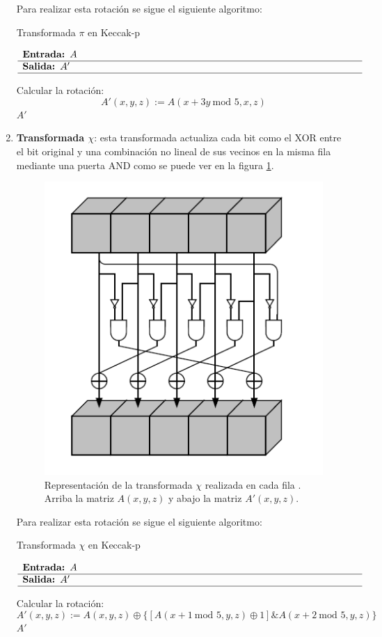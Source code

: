 \begin{enumerate}
	Para realizar esta rotación se sigue el siguiente algoritmo:
	\begin{algorithm}[H]
		\caption{Transformada \(\pi\) en Keccak-p}
		$\begin{array}{p{\textwidth}}
			\textbf{Entrada: }\(A\) \\ 
			\hline
			\textbf{Salida: }\(A'\) \\ 
			\hline
		\end{array}$
		\begin{algorithmic}[1]
			\State Calcular la rotación:
			\begin{equation}
				A'(x,y,z):=A(x+3y \ \text{mod } 5,x,z)
			\end{equation}
			\State \Return \(A'\)
		\end{algorithmic}
	\end{algorithm}
	
	
	\item \textbf{Transformada \(\chi\)}: esta transformada actualiza cada bit como el XOR entre el bit original y una combinación no lineal de sus vecinos en la misma fila mediante una puerta AND como se puede ver en la figura \ref{fig:chitransform}.
	
	\begin{figure}[H]
		\centering
		\includegraphics[width=0.4\linewidth]{figuras/PartsState1}
		\caption{Representación de la transformada $\chi$ realizada en cada fila \cite{FIPS202}. Arriba la matriz \(A(x,y,z)\) y abajo la matriz \(A'(x,y,z)\).}
		\label{fig:chitransform}
	\end{figure}
	\newpage
	Para realizar esta rotación se sigue el siguiente algoritmo:
	\begin{algorithm}[H]
		\caption{Transformada \(\chi\) en Keccak-p}
		$\begin{array}{p{\textwidth}}
			\textbf{Entrada: }\(A\) \\ 
			\hline
			\textbf{Salida: }\(A'\) \\ 
			\hline
		\end{array}$
		\begin{algorithmic}[1]
			\State Calcular la rotación:
			\begin{equation}
				A'(x,y,z):=A(x,y,z)\oplus\{[A(x+1 \ \text{mod } 5 ,y,z)\oplus 1]\& A(x+2 \ \text{mod } 5 ,y,z)\}
			\end{equation}
			\State \Return \(A'\)
		\end{algorithmic}
	\end{algorithm}
	

\end{enumerate}
